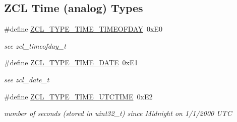 \subsection*{Z\+CL Time (analog) Types}
\begin{DoxyCompactItemize}
\item 
\mbox{\label{group__zcl__types_gaa6fdd0dcc77890280046eb1db9f79516}} 
\#define \hyperlink{group__zcl__types_gaa6fdd0dcc77890280046eb1db9f79516}{Z\+C\+L\+\_\+\+T\+Y\+P\+E\+\_\+\+T\+I\+M\+E\+\_\+\+T\+I\+M\+E\+O\+F\+D\+AY}~0x\+E0
\begin{DoxyCompactList}\small\item\em see zcl\+\_\+timeofday\+\_\+t \end{DoxyCompactList}\item 
\mbox{\label{group__zcl__types_gad5552b0825d941f0ccd7b1d797dc091b}} 
\#define \hyperlink{group__zcl__types_gad5552b0825d941f0ccd7b1d797dc091b}{Z\+C\+L\+\_\+\+T\+Y\+P\+E\+\_\+\+T\+I\+M\+E\+\_\+\+D\+A\+TE}~0x\+E1
\begin{DoxyCompactList}\small\item\em see zcl\+\_\+date\+\_\+t \end{DoxyCompactList}\item 
\mbox{\label{group__zcl__types_ga8f678e97557cb052c0df4be97e9f1e82}} 
\#define \hyperlink{group__zcl__types_ga8f678e97557cb052c0df4be97e9f1e82}{Z\+C\+L\+\_\+\+T\+Y\+P\+E\+\_\+\+T\+I\+M\+E\+\_\+\+U\+T\+C\+T\+I\+ME}~0x\+E2
\begin{DoxyCompactList}\small\item\em number of seconds (stored in uint32\+\_\+t) since Midnight on 1/1/2000 U\+TC \end{DoxyCompactList}\end{DoxyCompactItemize}
